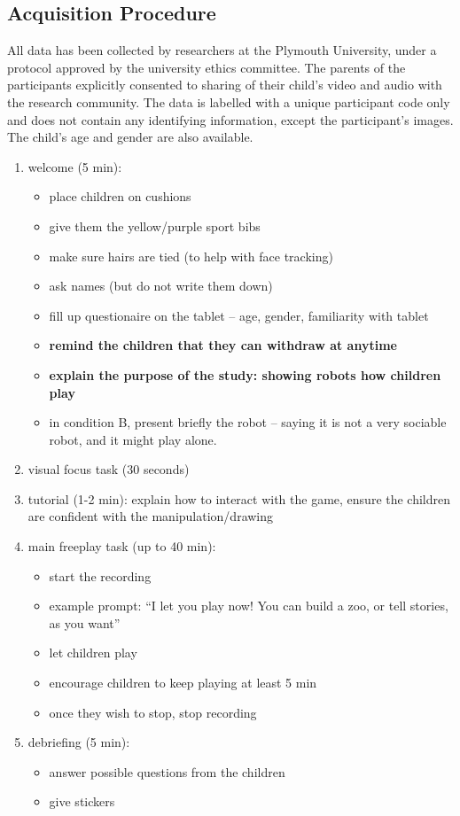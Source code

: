 \documentclass{article}
\begin{document}
\subsection{Acquisition Procedure}

All data has been collected by researchers at the Plymouth University, under a
protocol approved by the university ethics committee. The parents of the
participants explicitly consented to sharing of their child's video and audio
with the research community. The data is labelled with a unique participant code
only and does not contain any identifying information, except the participant's
images. The child's age and gender are also available.

\begin{enumerate}
\def\labelenumi{\arabic{enumi}.}
\item
  welcome (5 min):

  \begin{itemize}
  \item
    place children on cushions
  \item
    give them the yellow/purple sport bibs
  \item
    make sure hairs are tied (to help with face tracking)
  \item
    ask names (but do not write them down)
  \item
    fill up questionaire on the tablet -- age, gender, familiarity with
    tablet
  \item
    \textbf{remind the children that they can withdraw at anytime}
  \item
    \textbf{explain the purpose of the study: showing robots how
    children play}
  \item
    in condition B, present briefly the robot -- saying it is not a very
    sociable robot, and it might play alone.
  \end{itemize}
\item
  visual focus task (30 seconds)
\item
  tutorial (1-2 min): explain how to interact with the game, ensure the
  children are confident with the manipulation/drawing
\item
  main freeplay task (up to 40 min):

  \begin{itemize}
  \item
    start the recording
  \item
    example prompt: ``I let you play now! You can build a zoo, or tell
    stories, as you want''
  \item
    let children play
  \item
    encourage children to keep playing at least 5 min
  \item
    once they wish to stop, stop recording
  \end{itemize}
\item
  debriefing (5 min):

  \begin{itemize}
  \item
    answer possible questions from the children
  \item
    give stickers
  \end{itemize}
\end{enumerate}
\end{document}
